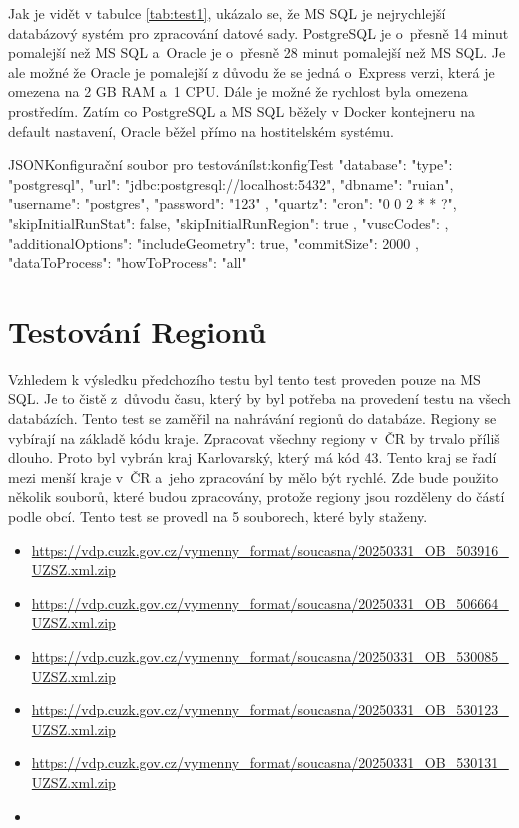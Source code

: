 Jak je vidět v tabulce \ref{tab:test1}, ukázalo se, že MS SQL je nejrychlejší databázový systém pro zpracování datové sady.
PostgreSQL je o~přesně 14 minut pomalejší než MS SQL a~Oracle je o~přesně 28 minut pomalejší než MS SQL.
Je ale možné že Oracle je pomalejší z důvodu že se jedná o~Express verzi, která je omezena na 2 GB RAM a~1 CPU.
Dále je možné že rychlost byla omezena prostředím. Zatím co PostgreSQL a MS SQL běžely v Docker kontejneru na default nastavení,
Oracle běžel přímo na hostitelském systému.

\begin{code}{JSON}{Konfigurační soubor pro testování}{lst:konfigTest}
  {
    "database": {
      "type": "postgresql",
      "url": "jdbc:postgresql://localhost:5432",
      "dbname": "ruian",
      "username": "postgres",
      "password": "123"
    },
    "quartz": {
      "cron": "0 0 2 * * ?",
      "skipInitialRunStat": false,
      "skipInitialRunRegion": true
    },
    "vuscCodes": {},
    "additionalOptions": {
      "includeGeometry": true,
      "commitSize": 2000
    },
    "dataToProcess": {
      "howToProcess": "all"
    }
  }
\end{code}

\section{Testování Regionů}
Vzhledem k výsledku předchozího testu byl tento test proveden pouze na MS SQL.
Je to čistě z~důvodu času, který by byl potřeba na provedení testu na všech databázích.
Tento test se zaměřil na nahrávání regionů do databáze.
Regiony se vybírají na základě kódu kraje. Zpracovat všechny regiony v~ČR by trvalo příliš dlouho.
Proto byl vybrán kraj Karlovarský, který má kód 43.
Tento kraj se řadí mezi menší kraje v~ČR a~jeho zpracování by mělo být rychlé.
Zde bude použito několik souborů, které budou zpracovány, protože regiony jsou rozděleny do částí podle obcí.
Tento test se provedl na 5 souborech, které byly staženy.
\begin{itemize}
  \item \url{https://vdp.cuzk.gov.cz/vymenny_format/soucasna/20250331_OB_503916_UZSZ.xml.zip}
  \item \url{https://vdp.cuzk.gov.cz/vymenny_format/soucasna/20250331_OB_506664_UZSZ.xml.zip}
  \item \url{https://vdp.cuzk.gov.cz/vymenny_format/soucasna/20250331_OB_530085_UZSZ.xml.zip}
  \item \url{https://vdp.cuzk.gov.cz/vymenny_format/soucasna/20250331_OB_530123_UZSZ.xml.zip}
  \item \url{https://vdp.cuzk.gov.cz/vymenny_format/soucasna/20250331_OB_530131_UZSZ.xml.zip}
  \item 
\end{itemize}

